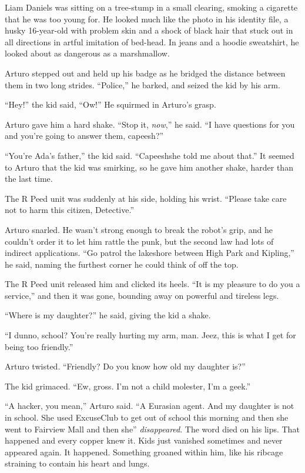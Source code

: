 Liam Daniels was sitting on a tree-stump in a small clearing,
smoking a cigarette that he was too young for. He looked much like
the photo in his identity file, a husky 16-year-old with problem
skin and a shock of black hair that stuck out in all directions in
artful imitation of bed-head. In jeans and a hoodie sweatshirt, he
looked about as dangerous as a marshmallow.

Arturo stepped out and held up his badge as he bridged the distance
between them in two long strides. “Police,” he barked, and seized
the kid by his arm.

“Hey!” the kid said, “Ow!” He squirmed in Arturo’s grasp.

Arturo gave him a hard shake. “Stop it, \emph{now},” he said. “I
have questions for you and you’re going to answer them, capeesh?”

“You’re Ada’s father,” the kid said. “Capeesh{\dash}she told me about
that.” It seemed to Arturo that the kid was smirking, so he gave
him another shake, harder than the last time.

The R Peed unit was suddenly at his side, holding his wrist.
“Please take care not to harm this citizen, Detective.”

Arturo snarled. He wasn’t strong enough to break the robot’s grip,
and he couldn’t order it to let him rattle the punk, but the second
law had lots of indirect applications. “Go patrol the lakeshore
between High Park and Kipling,” he said, naming the furthest corner
he could think of off the top.

The R Peed unit released him and clicked its heels. “It is my
pleasure to do you a service,” and then it was gone, bounding away
on powerful and tireless legs.

“Where is my daughter?” he said, giving the kid a shake.

“I dunno, school? You’re really hurting my arm, man. Jeez, this is
what I get for being too friendly.”

Arturo twisted. “Friendly? Do you know how old my daughter is?”

The kid grimaced. “Ew, gross. I’m not a child molester, I’m a
geek.”

“A hacker, you mean,” Arturo said. “A Eurasian agent. And my
daughter is not in school. She used ExcuseClub to get out of school
this morning and then she went to Fairview Mall and then she{\dash}”
\emph{disappeared}. The word died on his lips. That happened and
every copper knew it. Kids just vanished sometimes and never
appeared again. It happened. Something groaned within him, like his
ribcage straining to contain his heart and lungs.

